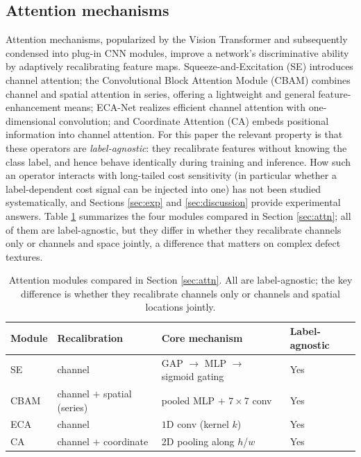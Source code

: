 \documentclass[a4paper,fleqn]{cas-sc}
\begin{document}
\begin{sloppypar}
	\subsection{Attention mechanisms}
	\par{
		Attention mechanisms, popularized by the Vision Transformer \citep{dosovitskiy2021image} and subsequently condensed into plug-in CNN modules, improve a network's discriminative ability by adaptively recalibrating feature maps. Squeeze-and-Excitation (SE) \citep{hu2018squeeze} introduces channel attention; the Convolutional Block Attention Module (CBAM) \citep{woo2018cbam} combines channel and spatial attention in series, offering a lightweight and general feature-enhancement means; ECA-Net \citep{wang2020eca} realizes efficient channel attention with one-dimensional convolution; and Coordinate Attention (CA) \citep{hou2021coordinate} embeds positional information into channel attention. For this paper the relevant property is that these operators are \emph{label-agnostic}: they recalibrate features without knowing the class label, and hence behave identically during training and inference. How such an operator interacts with long-tailed cost sensitivity (in particular whether a label-dependent cost signal can be injected into one) has not been studied systematically, and Sections \ref{sec:exp} and \ref{sec:discussion} provide experimental answers. Table \ref{tbl:attnlit} summarizes the four modules compared in Section \ref{sec:attn}; all of them are label-agnostic, but they differ in whether they recalibrate channels only or channels and space jointly, a difference that matters on complex defect textures.
	}

	\begin{table}[pos=htbp]
		\footnotesize
		\caption{Attention modules compared in Section \ref{sec:attn}. All are label-agnostic; the key difference is whether they recalibrate channels only or channels and spatial locations jointly.}
		\label{tbl:attnlit}
		\centering
		\begin{tabular}{llll}
			\hline
			\textbf{Module} & \textbf{Recalibration} & \textbf{Core mechanism} & \textbf{Label-agnostic} \\ \hline
			SE \citep{hu2018squeeze} & channel & GAP $\to$ MLP $\to$ sigmoid gating & Yes \\
			CBAM \citep{woo2018cbam} & channel $+$ spatial (series) & pooled MLP $+$ $7{\times}7$ conv & Yes \\
			ECA \citep{wang2020eca} & channel & $1$D conv (kernel $k$) & Yes \\
			CA \citep{hou2021coordinate} & channel $+$ coordinate & 2D pooling along $h$/$w$ & Yes \\ \hline
		\end{tabular}
	\end{table}


\end{sloppypar}
\end{document}

